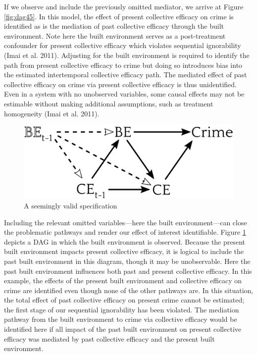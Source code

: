 \documentclass [11pt, proquest] {uwthesis}[2015/03/03]
\begin{document}
If we observe and include the previously omitted mediator, we arrive at Figure \ref{fig:dag45}. In this model, the effect of present collective efficacy on crime is identified as is the mediation of past collective efficacy through the built environment. Note here the built environment serves as a post-treatment confounder for present collective efficacy which violates sequential ignorability (Imai et al. 2011). Adjusting for the built environment is required to identify the path from present collective efficacy to crime but doing so introduces bias into the estimated intertemporal collective efficacy path. The mediated effect of past collective efficacy on crime via present collective efficacy is thus unidentified. Even in a system with no unobserved variables, some causal effects may not be estimable without making additional assumptions, such as treatment homogeneity (Imai et al. 2011).
\begin{figure}

{\centering \includegraphics[width=0.6\linewidth]{./figure/appendix/5_blocked_path} 

}

\caption{A seemingly valid specification}\label{fig:dag5}
\end{figure}
Including the relevant omitted variables---here the built environment---can close the problematic pathways and render our effect of interest identifiable. Figure \ref{fig:dag5} depicts a DAG in which the built environment is observed. Because the present built environment impacts present collective efficacy, it is logical to include the past built environment in this diagram, though it may be unobservable. Here the past built environment influences both past and present collective efficacy. In this example, the effects of the present built environment and collective efficacy on crime are identified even though none of the other pathways are. In this situation, the total effect of past collective efficacy on present crime cannot be estimated; the first stage of our sequential ignorability has been violated. The mediation pathway from the built environment to crime via collective efficacy would be identified here if all impact of the past built environment on present collective efficacy was mediated by past collective efficacy and the present built environment.
\end{document}

